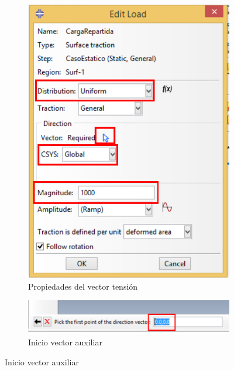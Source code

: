 \begin{enumerate}
\begin{figure}[H]
\centering
\begin{varwidth}{0.40\linewidth}  %
\begin{subfigure}{0.95\textwidth}
\includegraphics[width=\textwidth]{./body/images/imagen46.pdf}
\caption{Propiedades del vector tensión}
\label{figu46}
\end{subfigure}
\end{varwidth}\quad%
\begin{varwidth}{0.60\linewidth}  %
\begin{subfigure}{0.95\textwidth}
\includegraphics[width=\textwidth]{./body/images/imagen47.pdf}
\caption{Inicio vector auxiliar}

\end{subfigure}
\end{varwidth}
\end{figure}
\end{enumerate}
